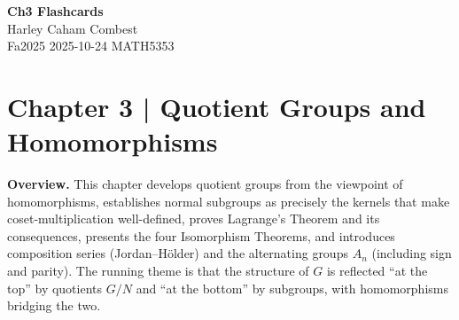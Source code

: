 \documentclass[12pt]{article}
\theoremstyle{definition}
\begin{document}
\begin{center}
\Large\textbf{Ch3 Flashcards} \\
\large Harley Caham Combest \\
\large Fa2025 2025-10-24 MATH5353
\end{center}

\newpage

\newpage

\dotfill
\section*{Chapter 3 | Quotient Groups and Homomorphisms}
\dotfill

\newpage

\textbf{Overview.}
This chapter develops quotient groups from the viewpoint of homomorphisms, establishes normal subgroups as precisely the kernels that make coset-multiplication well-defined, proves Lagrange’s Theorem and its consequences, presents the four Isomorphism Theorems, and introduces composition series (Jordan–Hölder) and the alternating groups $A_n$ (including sign and parity). The running theme is that the structure of $G$ is reflected “at the top” by quotients $G/N$ and “at the bottom” by subgroups, with homomorphisms bridging the two.
\end{document}
